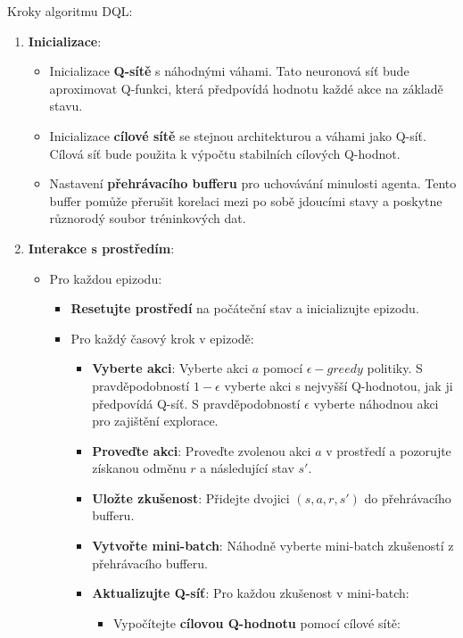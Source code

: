 Kroky algoritmu DQL:
\begin{enumerate}
    \item \textbf{Inicializace}:
    \begin{itemize}
        \item Inicializace \textbf{Q-sítě} s náhodnými váhami. Tato neuronová síť bude aproximovat Q-funkci, která předpovídá hodnotu každé akce na základě stavu.
        \item Inicializace \textbf{cílové sítě} se stejnou architekturou a váhami jako Q-síť. Cílová síť bude použita k výpočtu stabilních cílových Q-hodnot.
        \item Nastavení \textbf{přehrávacího bufferu} pro uchovávání minulosti agenta. Tento buffer pomůže přerušit korelaci mezi po sobě jdoucími stavy a poskytne různorodý soubor tréninkových dat.
    \end{itemize}
    \item \textbf{Interakce s prostředím}:
    \begin{itemize}
        \item Pro každou epizodu:
        \begin{itemize}
            \item \textbf{Resetujte prostředí} na počáteční stav a inicializujte epizodu.
            \item Pro každý časový krok v epizodě:
            \begin{itemize}
                \item \textbf{Vyberte akci}: Vyberte akci $a$ pomocí $\epsilon-greedy$ politiky. S pravděpodobností $1 - \epsilon$ vyberte akci s nejvyšší Q-hodnotou, jak ji předpovídá Q-síť. S pravděpodobností $\epsilon$ vyberte náhodnou akci pro zajištění explorace.
                \item \textbf{Proveďte akci}: Proveďte zvolenou akci $a$ v prostředí a pozorujte získanou odměnu $r$ a následující stav $s'$.
                \item \textbf{Uložte zkušenost}: Přidejte dvojici $(s, a, r, s')$ do přehrávacího bufferu.
                \item \textbf{Vytvořte mini-batch}: Náhodně vyberte mini-batch zkušeností z přehrávacího bufferu.
                \item \textbf{Aktualizujte Q-síť}: Pro každou zkušenost v mini-batch:
                \begin{itemize}
                    \item Vypočítejte \textbf{cílovou Q-hodnotu} pomocí cílové sítě:
                    \[
\]
\end{itemize}
\end{itemize}
\end{itemize}
\end{itemize}
\end{enumerate}
